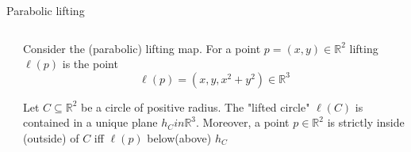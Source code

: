 \documentclass[10pt]{beamer}
\begin{document}
\begin{frame}{Parabolic lifting}
	\begin{columns}
		\begin{column}{0.4\textwidth} 
		\end{column}
		\begin{column}{0.6\textwidth}
			Consider the (parabolic) \alert{lifting map}.
			For a point $p=(x,y)\in \mathbb{R}^2$ lifting $\ell(p)$ is the point			
			$$
				\ell(p) = (x,y,x^2+y^2) \in \mathbb{R}^3
			$$
			
			Let $C \subseteq \mathbb{R}^2$ be a circle of positive radius. 
			The "lifted circle" $\ell(C)$ is contained in a unique plane 
			$h_C in \mathbb{R}^3$. Moreover, a point $p \in \mathbb{R}^2$
			is strictly inside (outside) of $C$ iff $\ell(p)$ below(above) $h_C$
		\end{column}
		
	\end{columns} 

\end{frame}
\end{document}
